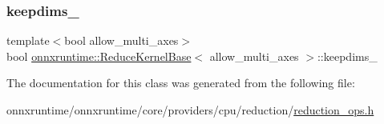 \subsubsection{\texorpdfstring{keepdims\+\_\+}{keepdims\_}}
{\footnotesize\ttfamily template$<$bool allow\+\_\+multi\+\_\+axes$>$ \\
bool \mbox{\hyperlink{classonnxruntime_1_1ReduceKernelBase}{onnxruntime\+::\+Reduce\+Kernel\+Base}}$<$ allow\+\_\+multi\+\_\+axes $>$\+::keepdims\+\_\+\hspace{0.3cm}{\ttfamily [protected]}}



The documentation for this class was generated from the following file\+:\begin{DoxyCompactItemize}
\item 
onnxruntime/onnxruntime/core/providers/cpu/reduction/\mbox{\hyperlink{cpu_2reduction_2reduction__ops_8h}{reduction\+\_\+ops.\+h}}\end{DoxyCompactItemize}
